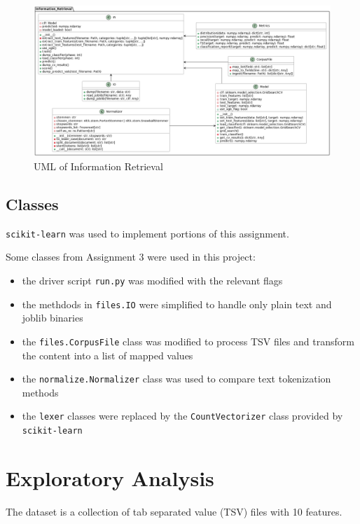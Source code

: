 \documentclass[11pt]{article}
\begin{document}
\begin{figure}[!ht]
    \includegraphics[scale=0.35]{statics/uml.png}
    \centering
    \caption{UML of Information Retrieval}
\end{figure}

\subsection{Classes}
\texttt{scikit-learn} \cite{scikit-learn} was used to implement portions of this assignment.

Some classes from Assignment 3 were used in this project:
\begin{itemize}
    \item the driver script \texttt{run.py} was modified with the relevant flags
    \item the methdods in \texttt{files.IO} were simplified to handle only plain text and joblib binaries
    \item the \texttt{files.CorpusFile} class was modified to process TSV files and transform the content into a list of mapped values
    \item the \texttt{normalize.Normalizer} class was used to compare text tokenization methods
    \item the \texttt{lexer} classes were replaced by the \texttt{CountVectorizer} class provided by \texttt{scikit-learn}
\end{itemize}

\section{Exploratory Analysis}
The dataset is a collection of tab separated value (TSV) files with 10 features.
\end{document}
